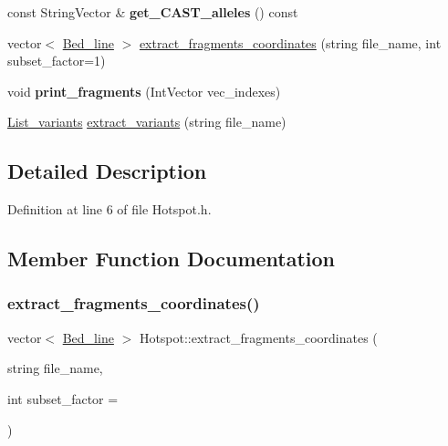 \begin{DoxyCompactItemize}
\mbox{\label{class_hotspot_ad2325fcf8b426a7b5e223fb7bc40cd0b}} 
const String\+Vector \& {\bfseries get\+\_\+\+C\+A\+S\+T\+\_\+alleles} () const
\item 
vector$<$ \mbox{\hyperlink{struct_bed__line}{Bed\+\_\+line}} $>$ \mbox{\hyperlink{class_hotspot_ad054dfef62c85f695a8dbb6909bb752a}{extract\+\_\+fragments\+\_\+coordinates}} (string file\+\_\+name, int subset\+\_\+factor=1)
\item 
\mbox{\label{class_hotspot_abadca6037200a03cde2ef1401641886d}} 
void {\bfseries print\+\_\+fragments} (Int\+Vector vec\+\_\+indexes)
\item 
\mbox{\hyperlink{struct_list__variants}{List\+\_\+variants}} \mbox{\hyperlink{class_hotspot_ab8ac666ae3fc8013188070eefae5e1cc}{extract\+\_\+variants}} (string file\+\_\+name)
\end{DoxyCompactItemize}


\subsection{Detailed Description}


Definition at line 6 of file Hotspot.\+h.



\subsection{Member Function Documentation}
\mbox{\label{class_hotspot_ad054dfef62c85f695a8dbb6909bb752a}} 
\subsubsection{\texorpdfstring{extract\+\_\+fragments\+\_\+coordinates()}{extract\_fragments\_coordinates()}}
{\footnotesize\ttfamily vector$<$ \mbox{\hyperlink{struct_bed__line}{Bed\+\_\+line}} $>$ Hotspot\+::extract\+\_\+fragments\+\_\+coordinates (\begin{DoxyParamCaption}\item[{string}]{file\+\_\+name,  }\item[{int}]{subset\+\_\+factor = {} }\end{DoxyParamCaption})}


